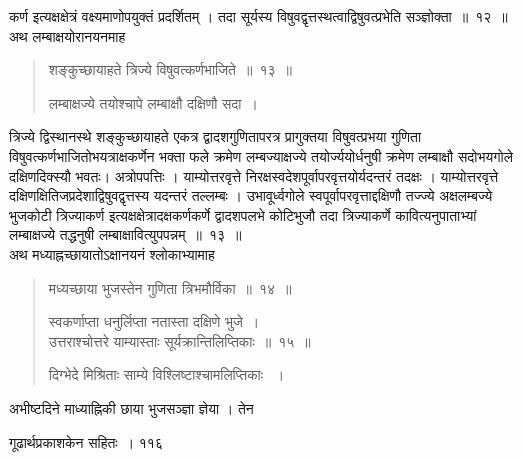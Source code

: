 \documentclass[11pt, openany]{book}
\begin{document}
\begin{sloppypar}
\noindent कर्ण इत्यक्षक्षेत्रं वक्ष्यमाणोपयुक्तं प्रदर्शितम् । तदा सूर्यस्य विषुवद्वृत्तस्थत्वाद्विषुवत्प्रभेति सञ्ज्ञोक्ता~॥~१२~॥\\
\noindent अथ लम्बाक्षयोरानयनमाह\textendash
\end{sloppypar}
\begin{quote}

 {\ssi शङ्कुच्छायाहते त्रिज्ये विषुवत्कर्णभाजिते~॥~१३~॥
 
लम्बाक्षज्ये तयोश्चापे लम्बाक्षौ दक्षिणौ सदा~।}
\end{quote}
\begin{sloppypar}
 त्रिज्ये द्विस्थानस्थे शङ्कुच्छायाहते एकत्र द्वादशगुणितापरत्र प्रागुक्तया विषुवत्प्रभया गुणिता विषुवत्कर्णभाजितोभयत्राक्षकर्णेन भक्ता फले क्रमेण लम्बज्याक्षज्ये तयोर्ज्ययोर्धनुषी क्रमेण लम्बाक्षौ सदोभयगोले दक्षिणदिक्स्यौ भवतः। अत्रोपपत्तिः । याम्योत्तरवृत्ते निरक्षस्वदेशपूर्वापरवृत्तयोर्यदन्तरं तदक्षः । याम्योत्तरवृत्ते दक्षिणक्षितिजप्रदेशाद्विषुवद्वृत्तस्य यदन्तरं तल्लम्बः । उभावूर्ध्वगोले स्वपूर्वापरवृत्ताद्दक्षिणौ तज्ज्ये अक्षलम्बज्ये भुजकोटी त्रिज्याकर्ण इत्यक्षक्षेत्रादक्षकर्णकर्णे द्वादशपलभे कोटिभुजौ तदा त्रिज्याकर्णे कावित्यनुपाताभ्यां लम्बाक्षज्ये तद्धनुषी लम्बाक्षावित्युपपन्नम्~॥~१३~॥\\
 \noindent अथ मध्याह्नच्छायातोऽक्षानयनं श्लोकाभ्यामाह\textendash
\end{sloppypar}
\begin{quote}

  {\ssi मध्यच्छाया भुजस्तेन गुणिता त्रिभमौर्विका~॥~१४~॥
  
स्वकर्णाप्ता धनुर्लिप्ता नतास्ता दक्षिणे भुजे~।\\
उत्तराश्चोत्तरे याम्यास्ताः सूर्यक्रान्तिलिप्तिकाः~॥~१५~॥

दिग्भेदे मिश्रिताः साम्ये विश्लिष्टाश्चामलिप्तिकाः ~।}
\end{quote}
 अभीष्टदिने माध्याह्निकी छाया भुजसञ्ज्ञा ज्ञेया । तेन


\newpage


\hspace{3cm} गूढार्थप्रकाशकेन सहितः~। \hfill ११६
\vspace{1cm}
\end{document}
